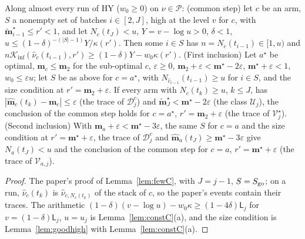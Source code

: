 \documentclass[11pt]{article}
\newcommand{\Kinf}{\mathcal K_{\inf}}
\newcommand{\cP}{\mathcal P}
\begin{document}
\begin{lemma}[few observations when $x=1$, on a run]\label{flem:fewC-run}
Along almost every run of HY ($w_0\ge0$) on $\nu\in\cP$:
(common step) let $c$ be an arm, $S$ a nonempty set of batches $i\in[2,J]$, high at the level $v$
for $c$, with $\tilde{\mathbf m}^\star_{i-1}\le r'<1$, and let $N_c(t_J)<u$, $Y=v-\log u>0$, $\delta<1$,
$u\le(1-\delta)^{-(|S|-1)}Y/\kappa(r')$. Then some $i\in S$ has $n=N_c(t_{i-1})\in[1,u)$ and
$n\Kinf(\hat\nu_c(t_{i-1}),r')\ge(1-\delta)Y-w_0\kappa(r')$.
(First inclusion) Let $a^\star$ be optimal, $\mathbf m_c\le\mathbf m_2$ for the sub-optimal $c$, $\varepsilon\ge0$,
$\mathbf m_2+\varepsilon<\mathbf m^\star-2\varepsilon$, $\mathbf m^\star+\varepsilon<1$, $w_0\le\varepsilon u$; let $S$ be as above for
$c=a^\star$, with $N_{\hat c_{i-1}}(t_{i-1})\ge u$ for $i\in S$, and the size condition at $r'=\mathbf m_2+\varepsilon$.
If every arm with $N_c(t_k)\ge u$, $k\le J$, has $|\hat{\mathbf m}_c(t_k)-\mathbf m_c|\le\varepsilon$ (the trace of
$\mathcal D_j^c$) and $\tilde{\mathbf m}^\star_J<\mathbf m^\star-2\varepsilon$ (the class $\mathcal U_j$), the conclusion of the common
step holds for $c=a^\star$, $r'=\mathbf m_2+\varepsilon$ (the trace of $\mathcal V^\star_j$).
(Second inclusion) With $\mathbf m_a+\varepsilon<\mathbf m^\star-3\varepsilon$, the same $S$ for $c=a$ and the size condition at
$r'=\mathbf m^\star+\varepsilon$, the trace of $\mathcal D_j^c$ and $\hat{\mathbf m}_a(t_J)\ge\mathbf m^\star-3\varepsilon$ give $N_a(t_J)<u$ and the
conclusion of the common step for $c=a$, $r'=\mathbf m^\star+\varepsilon$ (the trace of $\mathcal V_{a,j}$).
\end{lemma}

\begin{proof}
The paper's proof of Lemma~\ref{lem:fewC}, with $J=j-1$, $S=S_{\rm go}$; on a run,
$\hat\nu_c(t_k)$ is $\hat\nu_{c,N_c(t_k)}$ of the stack of $c$, so the paper's events contain their
traces. The arithmetic $(1-\delta)(v-\log u)-w_0\kappa\ge(1-4\delta)\mathsf L_j$ for
$v=(1-\delta)\mathsf L_j$, $u=u_j$ is Lemma~\ref{lem:constC}(a), and the size condition is
Lemma~\ref{lem:goodhigh} with Lemma~\ref{lem:constC}(a).
\end{proof}
\end{document}
